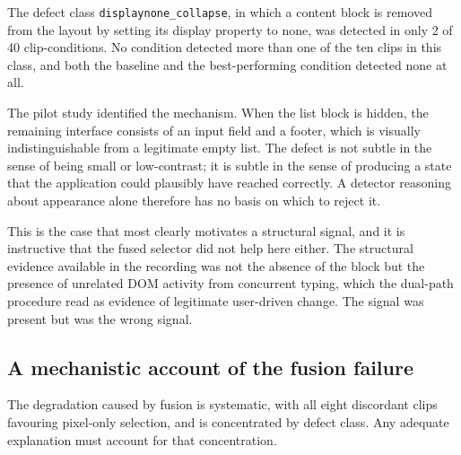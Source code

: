 The defect class \texttt{displaynone\_collapse}, in which a content block
is removed from the layout by setting its display property to none, was
detected in only 2 of 40 clip-conditions. No condition detected more than
one of the ten clips in this class, and both the baseline and the
best-performing condition detected none at all.

The pilot study identified the mechanism. When the list block is hidden,
the remaining interface consists of an input field and a footer, which is
visually indistinguishable from a legitimate empty list. The defect is not
subtle in the sense of being small or low-contrast; it is subtle in the
sense of producing a state that the application could plausibly have
reached correctly. A detector reasoning about appearance alone therefore
has no basis on which to reject it.

This is the case that most clearly motivates a structural signal, and it
is instructive that the fused selector did not help here either. The
structural evidence available in the recording was not the absence of the
block but the presence of unrelated DOM activity from concurrent typing,
which the dual-path procedure read as evidence of legitimate user-driven
change. The signal was present but was the wrong signal.

\subsection{A mechanistic account of the fusion failure}
\label{sec:failure-mechanism}

The degradation caused by fusion is systematic, with all eight discordant
clips favouring pixel-only selection, and is concentrated by defect class.
Any adequate explanation must account for that concentration.

